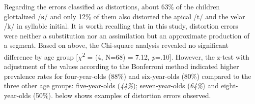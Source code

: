 \documentclass[output=paper,newtxmath,modfonts,nonflat,draftmode]{langsci/langscibook}
\begin{document}



Regarding the errors classified as distortions, about 63\% of the children glottalized /ʁ/ and only 12\% of them also distorted the apical /t/ and the velar /k/ in syllable initial. It is worth recalling that in this study, distortion errors were neither a substitution nor an assimilation but an approximate production of a segment. Based on  above, the Chi-square analysis revealed no significant difference by age group [$\chi$\textsuperscript{2} = (4, N=68) = 7.12, \textit{p}=.10]. However, the z-test with adjustment of the values according to the Bonferroni method indicated higher prevalence rates for four-year-olds (88\%) and six-year-olds (80\%) compared to the three other age groups: five-year-olds (\textit{44\%}); seven-year-olds (\textit{64\%}) and eight-year-olds (50\%).  below shows examples of distortion errors observed. 
\end{document}
